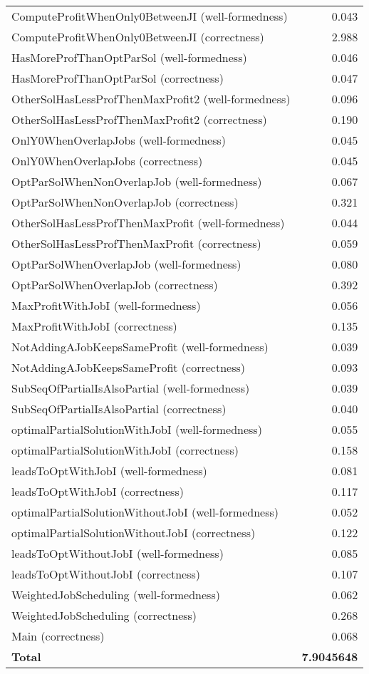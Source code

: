 \begin{longtable}{|l|r|}
ComputeProfitWhenOnly0BetweenJI (well-formedness) & 0.043 \\
ComputeProfitWhenOnly0BetweenJI (correctness) & 2.988 \\
HasMoreProfThanOptParSol (well-formedness) & 0.046 \\
HasMoreProfThanOptParSol (correctness) & 0.047 \\
OtherSolHasLessProfThenMaxProfit2 (well-formedness) & 0.096 \\
OtherSolHasLessProfThenMaxProfit2 (correctness) & 0.190 \\
OnlY0WhenOverlapJobs (well-formedness) & 0.045 \\
OnlY0WhenOverlapJobs (correctness) & 0.045 \\
OptParSolWhenNonOverlapJob (well-formedness) & 0.067 \\
OptParSolWhenNonOverlapJob (correctness) & 0.321 \\
OtherSolHasLessProfThenMaxProfit (well-formedness) & 0.044 \\
OtherSolHasLessProfThenMaxProfit (correctness) & 0.059 \\
OptParSolWhenOverlapJob (well-formedness) & 0.080 \\
OptParSolWhenOverlapJob (correctness) & 0.392 \\
MaxProfitWithJobI (well-formedness) & 0.056 \\
MaxProfitWithJobI (correctness) & 0.135 \\
NotAddingAJobKeepsSameProfit (well-formedness) & 0.039 \\
NotAddingAJobKeepsSameProfit (correctness) & 0.093 \\
SubSeqOfPartialIsAlsoPartial (well-formedness) & 0.039 \\
SubSeqOfPartialIsAlsoPartial (correctness) & 0.040 \\
optimalPartialSolutionWithJobI (well-formedness) & 0.055 \\
optimalPartialSolutionWithJobI (correctness) & 0.158 \\
leadsToOptWithJobI (well-formedness) & 0.081 \\
leadsToOptWithJobI (correctness) & 0.117 \\
optimalPartialSolutionWithoutJobI (well-formedness) & 0.052 \\
optimalPartialSolutionWithoutJobI (correctness) & 0.122 \\
leadsToOptWithoutJobI (well-formedness) & 0.085 \\
leadsToOptWithoutJobI (correctness) & 0.107 \\
WeightedJobScheduling (well-formedness) & 0.062 \\
WeightedJobScheduling (correctness) & 0.268 \\
Main (correctness) & 0.068 \\
\hline
\textbf{Total} & \textbf{7.9045648} \\
\hline

\end{longtable}

